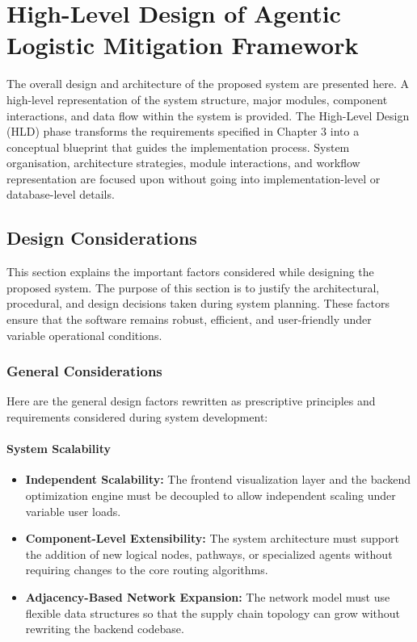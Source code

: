 \chapter[High-Level Design of Agentic Logistic Mitigation Framework]{High-Level Design of Agentic Logistic Mitigation Framework}

The overall design and architecture of the proposed system are presented here. A high-level representation of the system structure, major modules, component interactions, and data flow within the system is provided. The High-Level Design (HLD) phase transforms the requirements specified in Chapter 3 into a conceptual blueprint that guides the implementation process. System organisation, architecture strategies, module interactions, and workflow representation are focused upon without going into implementation-level or database-level details.


\section[Design Considerations]{Design Considerations}
This section explains the important factors considered while designing the proposed system. The purpose of this section is to justify the architectural, procedural, and design decisions taken during system planning. These factors ensure that the software remains robust, efficient, and user-friendly under variable operational conditions.
\subsection[General Considerations]{General Considerations}

Here are the general design factors rewritten as prescriptive principles and requirements considered during system development:

\subsubsection{System Scalability}
\begin{itemize}
    \item \textbf{Independent Scalability:} The frontend visualization layer and the backend optimization engine must be decoupled to allow independent scaling under variable user loads.
    \item \textbf{Component-Level Extensibility:} The system architecture must support the addition of new logical nodes, pathways, or specialized agents without requiring changes to the core routing algorithms.
    \item \textbf{Adjacency-Based Network Expansion:} The network model must use flexible data structures so that the supply chain topology can grow without rewriting the backend codebase.
\end{itemize}

